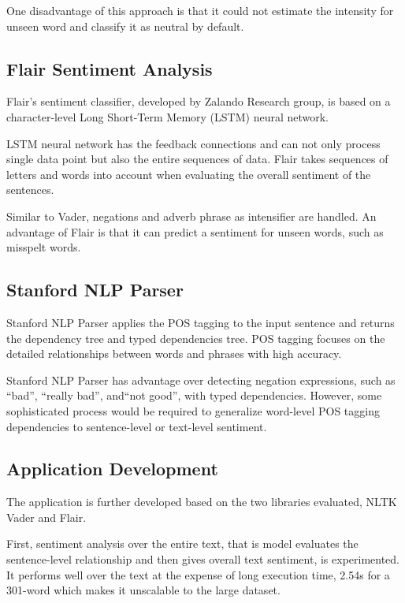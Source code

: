 \documentclass[sigconf]{acmart}
\begin{document}
One disadvantage of this approach is that it could not estimate the intensity for unseen word and classify it as neutral by default.

\subsection{Flair Sentiment Analysis}

Flair’s sentiment classifier, developed by Zalando Research group\cite{Flair}, is based on a character-level Long Short-Term Memory (LSTM)\cite{LSTM} neural network.

LSTM neural network has the feedback connections and can not only process single data point but also the entire sequences of data. Flair takes sequences of letters and words into account when evaluating the overall sentiment of the sentences.

Similar to Vader, negations and adverb phrase as intensifier are handled. An advantage of Flair is that it can predict a sentiment for unseen words, such as misspelt words.

\subsection{Stanford NLP Parser}

Stanford NLP Parser applies the POS tagging to the input sentence and returns the dependency tree and typed dependencies tree. POS tagging focuses on the detailed relationships between words and phrases with high accuracy.

Stanford NLP Parser has advantage over detecting negation expressions, such as “bad”, “really bad”, and“not good”, with typed dependencies. However, some sophisticated process would be required to generalize word-level POS tagging dependencies to sentence-level or text-level sentiment. 

\subsection{Application Development}
The application is further developed  based on the two libraries evaluated, NLTK Vader and Flair. 

First, sentiment analysis over the entire text, that is model evaluates the sentence-level relationship and then gives overall text sentiment, is experimented. It performs well over the text at the expense of long execution time, 2.54s for a 301-word which makes it unscalable to the large dataset.
\end{document}

